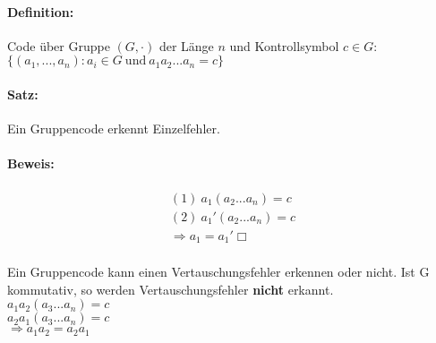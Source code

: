 \paragraph{Definition:} 
Code über Gruppe $(G,\cdot)$ der Länge $n$ und Kontrollsymbol $c \in G$: $\{(a_1,...,a_n) \colon a_i \in G \ \mbox{und} \ a_1 a_2 ... a_n = c\}$

\paragraph{Satz:}Ein Gruppencode erkennt Einzelfehler. 

\paragraph{Beweis:}  
\[
\begin{array}{c}
(1) \ a_1 (a_2 ... a_n) = c\\
(2) \ a_1' (a_2 ... a_n) = c \\
\Rightarrow a_1 = a_1' \Box\\
\end{array}
\]

Ein Gruppencode kann einen Vertauschungsfehler erkennen oder nicht. Ist G kommutativ, so werden Vertauschungsfehler \textbf{nicht} erkannt. \\
$a_1 a_2 (a_3 ... a_n) = c$\\
$a_2 a_1 (a_3 ... a_n) = c$\\
$\Rightarrow a_1 a_2 = a_2 a_1$\\

